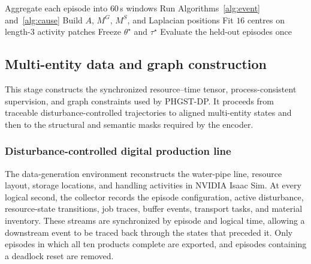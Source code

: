 \documentclass[a4paper,fleqn]{cas-dc}
\begin{document}
\begin{algorithm}[t]
\caption{Training and held-out evaluation.}
\label{alg:phgst-train}
\;
Aggregate each episode into $60$\,s windows\;
Run Algorithms~\ref{alg:event} and~\ref{alg:cause}\;
Build $A$, $M^{G}$, $M^{S}$, and Laplacian positions\;
Fit $16$ centres on length-$3$ activity patches\;
\;
Freeze $\theta^{\star}$ and $\tau^{\star}$\;
Evaluate the held-out episodes once\;
\end{algorithm}

\subsection{Multi-entity data and graph construction}

This stage constructs the synchronized resource--time tensor, process-consistent supervision, and graph constraints used by PHGST-DP. It proceeds from traceable disturbance-controlled trajectories to aligned multi-entity states and then to the structural and semantic masks required by the encoder.


\subsubsection{Disturbance-controlled digital production line}

The data-generation environment reconstructs the water-pipe line, resource layout, storage locations, and handling activities in NVIDIA Isaac Sim. At every logical second, the collector records the episode configuration, active disturbance, resource-state transitions, job traces, buffer events, transport tasks, and material inventory. These streams are synchronized by episode and logical time, allowing a downstream event to be traced back through the states that preceded it. Only episodes in which all ten products complete are exported, and episodes containing a deadlock reset are removed.
\end{document}
